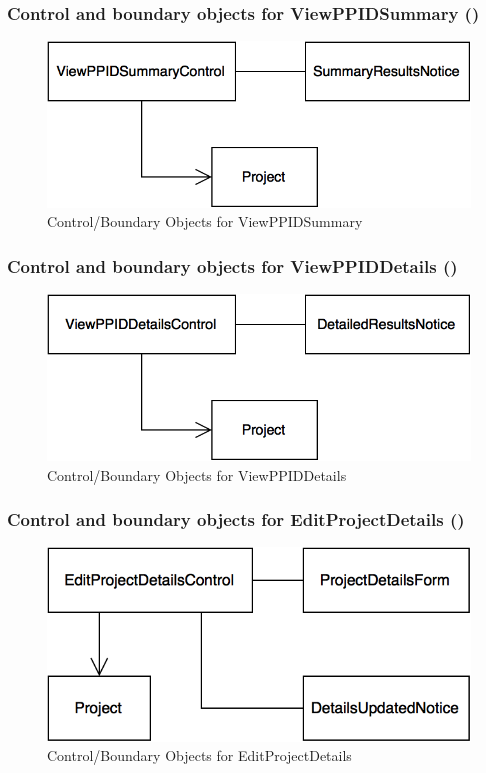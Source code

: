 \documentclass[12pt,letterpaper]{article}
\begin{document}
\subsubsection*{Control and boundary objects for ViewPPIDSummary (\viewppidsummary{})}

\begin{figure}[H]
	\centering{}
	\includegraphics[scale=0.4]{imgs/cbod/view-ppid-summary.png}
	\caption{Control/Boundary Objects for ViewPPIDSummary}
\end{figure}

\subsubsection*{Control and boundary objects for ViewPPIDDetails (\viewppiddetails{})}

\begin{figure}[H]
	\centering{}
	\includegraphics[scale=0.4]{imgs/cbod/view-ppid-details.png}
	\caption{Control/Boundary Objects for ViewPPIDDetails}
\end{figure}

\subsubsection*{Control and boundary objects for EditProjectDetails (\editprojectdetails{})}

\begin{figure}[H]
	\centering{}
	\includegraphics[scale=0.4]{imgs/cbod/edit-project-details.png}
	\caption{Control/Boundary Objects for EditProjectDetails}    
\end{figure}
\end{document}
